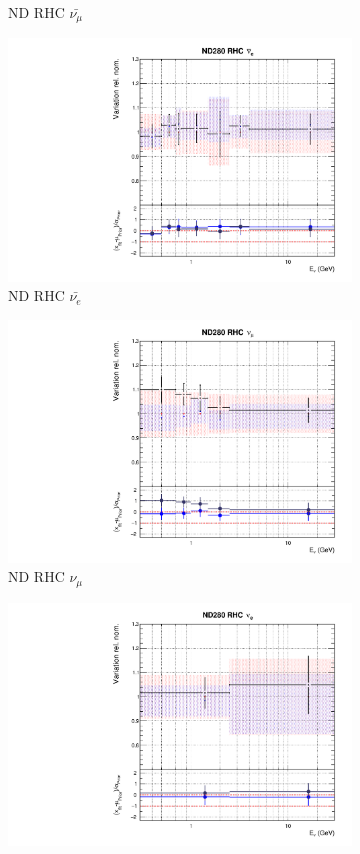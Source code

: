 \begin{figure}[t]
\begin{subfigure}{0.24\textwidth}
  \caption{ND RHC $\bar{\nu_{\mu}}$}
\end{subfigure}
\begin{subfigure}{0.24\textwidth}
  \centering
  \includegraphics[width=0.95\linewidth]{figs/rhcmpdat28flux_5}
  \caption{ND RHC $\bar{\nu_e}$}
\end{subfigure}
\begin{subfigure}{0.24\textwidth}
  \centering
  \includegraphics[width=0.95\linewidth]{figs/rhcmpdat28flux_6}
  \caption{ND RHC $\nu_{\mu}$}
\end{subfigure}
\vspace{15mm}
\begin{subfigure}{0.24\textwidth}
  \centering
  \includegraphics[width=0.95\linewidth]{figs/rhcmpdat28flux_7}

\end{subfigure}
\end{figure}
